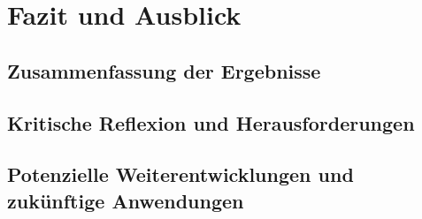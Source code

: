 \chapter{Fazit und Ausblick}
\section{Zusammenfassung der Ergebnisse}
\section{Kritische Reflexion und Herausforderungen}
\section{Potenzielle Weiterentwicklungen und zukünftige Anwendungen}